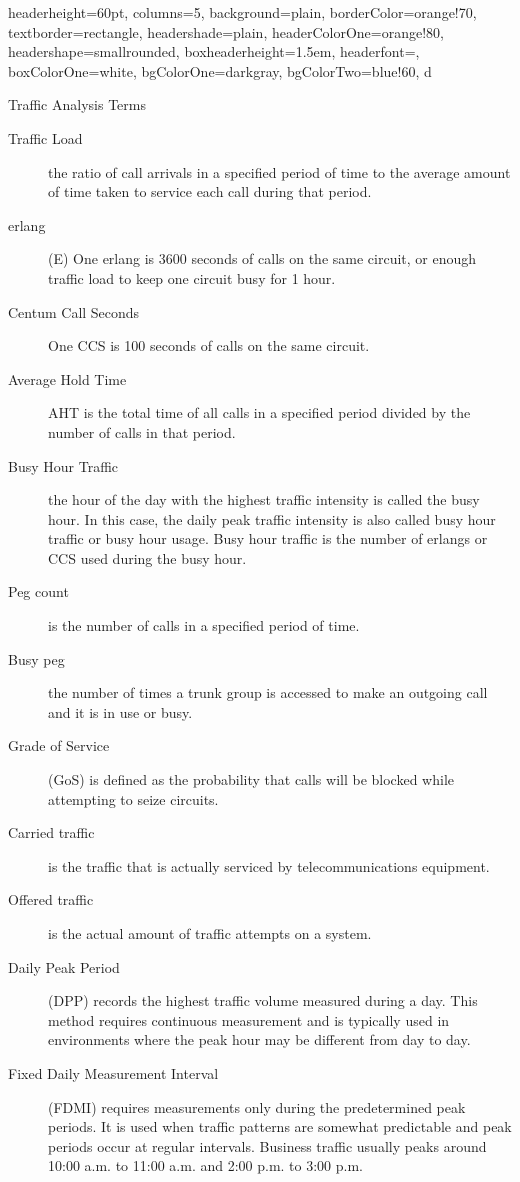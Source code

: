 \documentclass[landscape,fontscale=1,margin=0.2cm,paperwidth=70truecm, paperheight=40truecm,debug]{baposter}
\begin{document}
\begin{poster}{
  headerheight=60pt,
  columns=5,
  background=plain,
  borderColor=orange!70,
  textborder=rectangle,
  headershade=plain,
  headerColorOne=orange!80,
  headershape=smallrounded,
  boxheaderheight=1.5em,
  headerfont={},
  boxColorOne=white,
  bgColorOne=darkgray,
  bgColorTwo=blue!60,
}{}{\Large{\color{white}{U.S. Coast Guard Information Technician Cheat Sheet}}}{}{d}

\begin{posterbox}[column=0]{Traffic Analysis Terms}
\begin{description}
\item[Traffic Load] the ratio of call arrivals in a specified period of time to the average amount of time taken to service each call during that period.
\item[erlang](E) One erlang is 3600 seconds of calls on the same circuit, or enough traffic load to keep one circuit busy for 1 hour.  
\item[Centum Call Seconds] One CCS is 100 seconds of calls on the same circuit.
\item[Average Hold Time] AHT is the total time of all calls in a specified period divided by the number of calls in that period.
\item[Busy Hour Traffic] the hour of the day with the highest traffic intensity is called the busy hour. In this case, the daily peak traffic intensity is also called busy hour traffic or busy hour usage. Busy hour traffic is the number of erlangs or CCS used during the busy hour.
\item[Peg count] is the number of calls in a specified period of time.
\item[Busy peg] the number of times a trunk group is accessed to make an outgoing call and it is in use or busy.
\item[Grade of Service] (GoS) is defined as the probability that calls will be blocked while attempting to seize circuits.
\item[Carried traffic] is the traffic that is actually serviced by telecommunications equipment.
\item[Offered traffic] is the actual amount of traffic attempts on a system.
\item[Daily Peak Period] (DPP) records the highest traffic volume measured during a day. This method requires continuous measurement and is typically used in environments where the peak hour may be different from day to day.
\item[Fixed Daily Measurement Interval](FDMI) requires measurements only during the predetermined peak periods. It is used when traffic patterns are somewhat predictable and peak periods occur at regular intervals. Business traffic usually peaks around 10:00 a.m. to 11:00 a.m. and 2:00 p.m. to 3:00 p.m.


\end{description}
\end{posterbox}
\end{poster}
\end{document}
